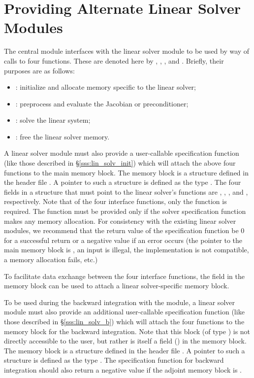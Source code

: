 \chapter{Providing Alternate Linear Solver Modules}\label{s:new_linsolv}
The central {\cvodes} module interfaces with the linear solver module to be
used by way of calls to four functions.  These are denoted here by 
, , , and .
Briefly, their purposes are as follows:
\begin{itemize}
\item {}: initialize and allocate memory specific to the
  linear solver;
\item {}: preprocess and evaluate the Jacobian or preconditioner;
\item {}: solve the linear system;
\item {}: free the linear solver memory.
\end{itemize}
A linear solver module must also provide a user-callable specification
function (like those described in \S\ref{sss:lin_solv_init}) which
will attach the above four functions to the main {\cvodes} memory block.
The {\cvodes} memory block is a structure defined in the header file
.
A pointer to such a structure is defined as the type . 
The four fields in a  structure that must point to the
linear solver's functions are , ,
, and , respectively.
Note that of the four interface functions, only the 
function is required.  The  function must be provided only
if the solver specification function makes any memory allocation.
For consistency with the existing {\cvodes} linear solver modules, we
recommend that the return value of the specification function be 0 for
a successful return or a negative value if an error occurs (the
pointer to the main {\cvodes} memory block is , an input is
illegal, the {\nvector} implementation is not compatible, a memory
allocation fails, etc.)

To facilitate data exchange between the four interface functions, the
field  in the {\cvodes} memory block can be used to
attach a linear solver-specific memory block.


To be used during the backward integration with the {\cvodea} module,
a linear solver module must also provide an additional user-callable
specification function (like those described in
\S\ref{sss:lin_solv_b}) which will attach the four functions to the
{\cvodes} memory block for the backward integration. Note that this
block (of type ) is not directly accessible to
the user, but rather is itself a field () in the
{\cvodea} memory block.  The {\cvodea} memory block is a structure
defined in the header file .  A pointer to such a
structure is defined as the type .
The specification function for backward integration should also return
a negative value if the adjoint {\cvodea} memory block is .

